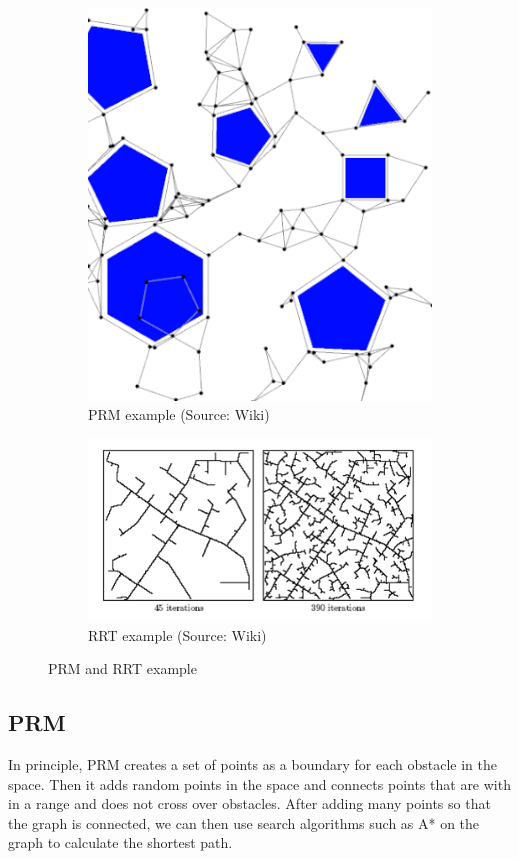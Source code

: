 \documentclass[12pt]{article}
\begin{document}
\begin{figure}
\centering
\begin{subfigure}{.5\textwidth}
    \centering
    \includegraphics[width=.6\linewidth]{prm-example.png}
    \caption{PRM example (Source: Wiki)}
    \label{fig:prm}
\end{subfigure}%
\begin{subfigure}{.5\textwidth}
    \centering
    \includegraphics[width=.6\linewidth]{rrt-example.png}
    \caption{RRT example (Source: Wiki)}
    \label{fig:rrt}
\end{subfigure}
\caption{PRM and RRT example}
\end{figure}



\subsection*{PRM}
In principle, PRM creates a set of points as a boundary for each obstacle in the space. Then it adds random points in the space and connects points that are with in a range and does not cross over obstacles. After adding many points so that the graph is connected, we can then use search algorithms such as A* on the graph to calculate the shortest path.
\end{document}
